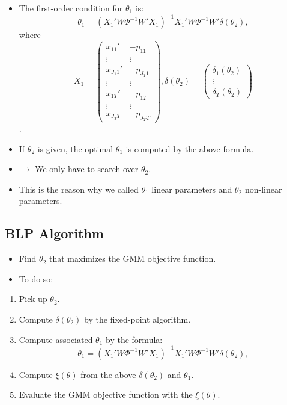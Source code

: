 \documentclass[
]{book}
\providecommand{\tightlist}{%
  \setlength{\itemsep}{0pt}\setlength{\parskip}{0pt}}
\begin{document}
\begin{itemize}
\tightlist
\item
  The first-order condition for \(\theta_1\) is:
  \begin{equation}
  \theta_1 = (X_1'W \Phi^{-1} W'X_1)^{-1} X_1' W \Phi^{-1} W' \delta(\theta_2),
  \end{equation}
  where
  \begin{equation}
  X_1 = 
  \begin{pmatrix}
  x_{11}' & - p_{11}\\
  \vdots & \vdots \\
  x_{J_1 1}' & - p_{J_1 1}\\
  \vdots & \vdots \\
  x_{1T}' & - p_{1T}\\
  \vdots & \vdots \\
  x_{J_T T} & - p_{J_T T}
  \end{pmatrix},
  \delta(\theta_2) =
  \begin{pmatrix}
  \delta_1(\theta_2)\\
  \vdots\\
  \delta_T(\theta_2)
  \end{pmatrix}
  \end{equation}.
\item
  If \(\theta_2\) is given, the optimal \(\theta_1\) is computed by the above formula.
\item
  \(\rightarrow\) We only have to search over \(\theta_2\).
\item
  This is the reason why we called \(\theta_1\) linear parameters and \(\theta_2\) non-linear parameters.
\end{itemize}

\hypertarget{blp-algorithm}{%
\subsection{BLP Algorithm}\label{blp-algorithm}}

\begin{itemize}
\tightlist
\item
  Find \(\theta_2\) that maximizes the GMM objective function.
\item
  To do so:
\end{itemize}

\begin{enumerate}
\def\labelenumi{\arabic{enumi}.}
\tightlist
\item
  Pick up \(\theta_2\).
\item
  Compute \(\delta(\theta_2)\) by the fixed-point algorithm.
\item
  Compute associated \(\theta_1\) by the formula:
  \begin{equation}
  \theta_1 = (X_1'W \Phi^{-1} W'X_1)^{-1} X_1' W \Phi^{-1} W' \delta(\theta_2),
  \end{equation}
\item
  Compute \(\xi(\theta)\) from the above \(\delta(\theta_2)\) and \(\theta_1\).
\item
  Evaluate the GMM objective function with the \(\xi(\theta)\).
\end{enumerate}
\end{document}
